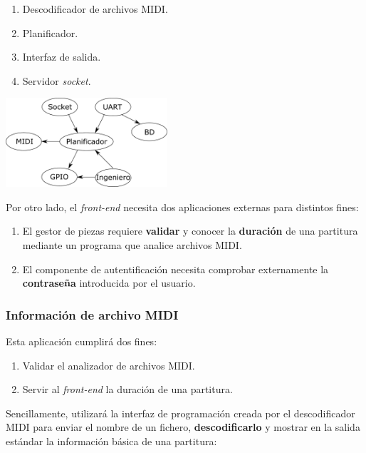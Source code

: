 \documentclass[10pt,a4paper]{article}
\begin{document}
	\begin{multicols}{2}
		\begin{enumerate}
			\item Descodificador de archivos MIDI.
			\item Planificador.
			\item Interfaz de salida.
			\item Servidor \textit{socket}.
		\end{enumerate}
		\columnbreak
		\begin{center}
			\includegraphics[width=0.45\textwidth]{images/daemon} 
		\end{center}
	\end{multicols}
	
	Por otro lado, el \textit{front-end} necesita dos aplicaciones externas para distintos fines:
	
	\begin{enumerate}
		\item El gestor de piezas requiere \textbf{validar} y conocer la \textbf{duración} de una partitura mediante un programa que analice archivos MIDI.
		
		\item El componente de autentificación necesita comprobar externamente la \textbf{contraseña} introducida por el usuario.
	\end{enumerate}
	
	\subsubsection*{Información de archivo MIDI}
	
	Esta aplicación cumplirá dos fines:
	
	\begin{enumerate}
		\item Validar el analizador de archivos MIDI.
		\item Servir al \textit{front-end} la duración de una partitura.
	\end{enumerate}
	
	Sencillamente, utilizará la interfaz de programación creada por el descodificador MIDI para enviar el nombre de un fichero, \textbf{descodificarlo} y mostrar en la salida estándar la información básica de una partitura:
	
\end{document}

